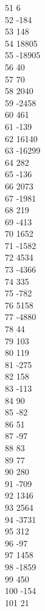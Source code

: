 { 51	6 \\
 52	-184 \\
 53	148 \\
 54	18805 \\
 55	-18905 \\
 56	40 \\
 57	70 \\
 58	2040 \\
 59	-2458 \\
 60	461 \\
 61	-139 \\
 62	16140 \\
 63	-16299 \\
 64	282 \\
 65	-136 \\
 66	2073 \\
 67	-1981 \\
 68	219 \\
 69	-413 \\
 70	1652 \\
 71	-1582 \\
 72	4534 \\
 73	-4366 \\
 74	335 \\
 75	-782 \\
 76	5158 \\
 77	-4880 \\
 78	44 \\
 79	103 \\
 80	119 \\
 81	-275 \\
 82	158 \\
 83	-113 \\
 84	90 \\
 85	-82 \\
 86	51 \\
 87	-97 \\
 88	83 \\
 89	77 \\
 90	280 \\
 91	-709 \\
 92	1346 \\
 93	2564 \\
 94	-3731 \\
 95	312 \\
 96	-97 \\
 97	1458 \\
 98	-1859 \\
 99	450 \\
 100	-154 \\
 101	21 \\
}
